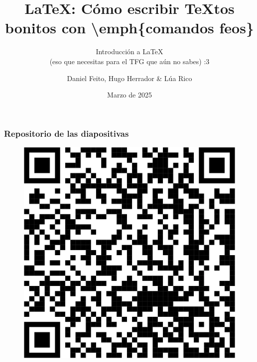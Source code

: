 \documentclass{beamer}
\title[Introducción a LaTeX]{\LaTeX: Cómo escribir TeXtos bonitos con \textbackslash emph\{comandos feos\}}
\subtitle{Introducción a LaTeX \\ (eso que necesitas para el TFG que aún no sabes) :3}
\author[Feito, Herrador \& Lúa]{Daniel Feito, Hugo Herrador \& Lúa Rico}
\institute{DAFIC $\times$ GPUL}
\date[GPUL School 2025]{Marzo de 2025}
\begin{document}
\frame{\titlepage}


\begin{frame}[fragile]
\frametitle{Repositorio de las diapositivas}

\begin{figure}
    \centering
    \includegraphics[width=0.5\linewidth]{images/QR.png}
\end{figure}

\end{frame}















\end{document}
